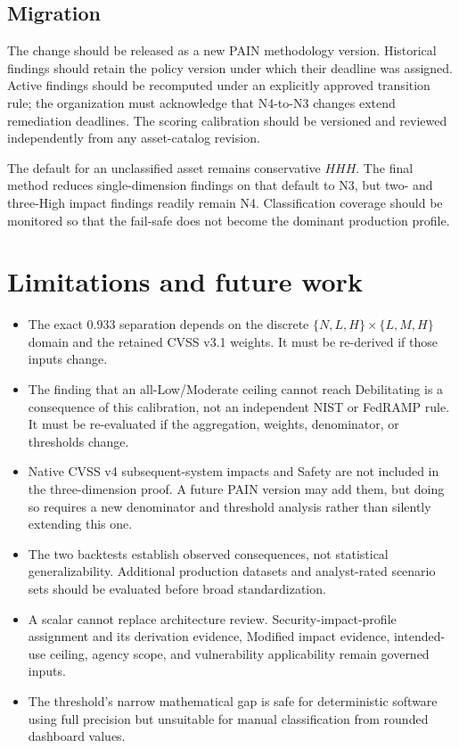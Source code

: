 \documentclass[11pt]{article}
\begin{document}
\subsection{Migration}

The change should be released as a new PAIN methodology version. Historical
findings should retain the policy version under which their deadline was assigned.
Active findings should be recomputed under an explicitly approved transition rule;
the organization must acknowledge that N4-to-N3 changes extend remediation
deadlines. The scoring calibration should be versioned and reviewed independently
from any asset-catalog revision.

The default for an unclassified asset remains conservative $HHH$. The final method
reduces single-dimension findings on that default to N3, but two- and three-High
impact findings readily remain N4. Classification coverage should be monitored so
that the fail-safe does not become the dominant production profile.

\section{Limitations and future work}

\begin{itemize}[leftmargin=1.5em]
\item The exact $0.933$ separation depends on the discrete
  $\{N,L,H\}\times\{L,M,H\}$ domain and the retained CVSS v3.1 weights. It must be
  re-derived if those inputs change.
\item The finding that an all-Low/Moderate ceiling cannot reach Debilitating is a
  consequence of this calibration, not an independent NIST or FedRAMP rule. It
  must be re-evaluated if the aggregation, weights, denominator, or thresholds
  change.
\item Native CVSS v4 subsequent-system impacts and Safety are not included in the
  three-dimension proof. A future PAIN version may add them, but doing so requires a
  new denominator and threshold analysis rather than silently extending this one.
\item The two backtests establish observed consequences, not statistical
  generalizability. Additional production datasets and analyst-rated scenario sets
  should be evaluated before broad standardization.
\item A scalar cannot replace architecture review. Security-impact-profile
  assignment and its derivation evidence, Modified impact evidence, intended-use
  ceiling, agency scope, and vulnerability applicability remain governed inputs.
\item The threshold's narrow mathematical gap is safe for deterministic software
  using full precision but unsuitable for manual classification from rounded
  dashboard values.
\end{itemize}
\end{document}
